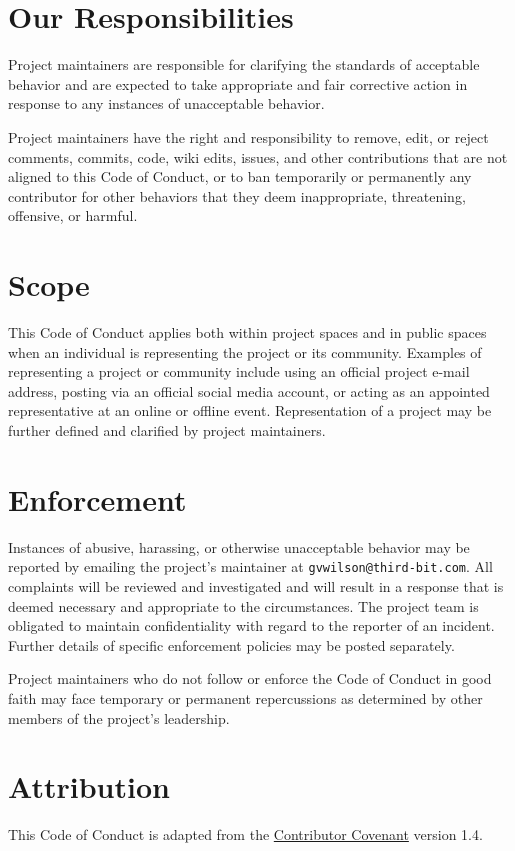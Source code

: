 \section{Our Responsibilities}\label{our-responsibilities-1}

Project maintainers are responsible for clarifying the standards of
acceptable behavior and are expected to take appropriate and fair
corrective action in response to any instances of unacceptable
behavior.

Project maintainers have the right and responsibility to remove, edit,
or reject comments, commits, code, wiki edits, issues, and other
contributions that are not aligned to this Code of Conduct, or to ban
temporarily or permanently any contributor for other behaviors that
they deem inappropriate, threatening, offensive, or harmful.

\section{Scope}\label{scope-1}

This Code of Conduct applies both within project spaces and in public
spaces when an individual is representing the project or its
community. Examples of representing a project or community include
using an official project e-mail address, posting via an official
social media account, or acting as an appointed representative at an
online or offline event. Representation of a project may be further
defined and clarified by project maintainers.

\section{Enforcement}\label{enforcement-1}

Instances of abusive, harassing, or otherwise unacceptable behavior
may be reported by emailing the project's maintainer at \texttt{gvwilson@third-bit.com}.
All complaints will be reviewed and investigated and will result in a
response that is deemed necessary and appropriate to the
circumstances. The project team is obligated to maintain
confidentiality with regard to the reporter of an incident. Further
details of specific enforcement policies may be posted separately.

Project maintainers who do not follow or enforce the Code of Conduct
in good faith may face temporary or permanent repercussions as
determined by other members of the project's leadership.

\section{Attribution}\label{attribution}

This Code of Conduct is adapted from
the \href{https://www.contributor-covenant.org}{Contributor Covenant} version 1.4.
